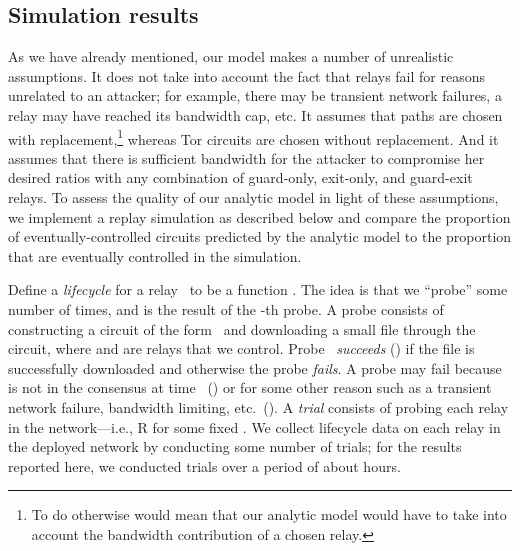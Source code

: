 \documentclass[]{lmcs}
\begin{document}
\subsection{Simulation results}
\label{sec:sim-results}

As we have already mentioned,
our model makes a number of unrealistic assumptions.
It does not take into
account the fact that relays fail for reasons unrelated to an attacker;
for example, there may be transient network failures, a relay may
have reached its bandwidth cap, etc.
It assumes that paths are chosen with 
replacement,\footnote{To do otherwise would mean that our analytic model
would have to take into account the bandwidth contribution of a chosen relay.}
whereas Tor circuits are chosen without replacement.
And it assumes that there is sufficient bandwidth for the attacker
to compromise her desired ratios with any combination of guard-only,
exit-only, and guard-exit relays.
To assess the quality of our analytic model in light of these assumptions,
we implement a replay simulation as described below and compare the
proportion of eventually-controlled circuits predicted by the analytic
model to the proportion that are eventually controlled in the simulation.

Define a \emph{lifecycle} for a relay~ to be a function
.  The idea is that we
``probe''  some number of times, and  is the result of the
-th probe.  A probe consists of constructing a circuit
of the form~ and downloading a small file through the circuit,
where  and  are relays that we control.  Probe~ \emph{succeeds}
() if the file is successfully downloaded and otherwise
the probe \emph{fails}.  A probe may fail because  is not in 
the consensus at time~ () or for some other reason
such as a transient network failure, bandwidth limiting, etc.\
().  A \emph{trial} consists of probing each
relay in the network---i.e., 
R for some fixed .
We collect lifecycle data on each relay in the
deployed network by conducting some number of trials; for the
results reported here, we conducted  trials over a period
of about  hours.
\end{document}
